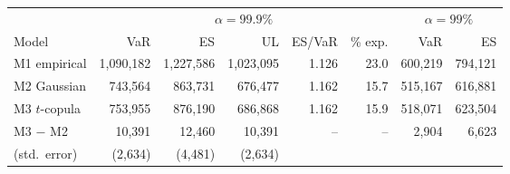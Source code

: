 \begin{tabular}{lrrrrrrr}
\toprule
 & \multicolumn{5}{c}{$\alpha=99.9\%$} & \multicolumn{2}{c}{$\alpha=99\%$} \\
\cmidrule(lr){2-6}\cmidrule(lr){7-8}
Model & VaR & ES & UL & ES/VaR & \% exp. & VaR & ES \\
\midrule
M1 empirical & 1,090,182 & 1,227,586 & 1,023,095 & 1.126 & 23.0 & 600,219 & 794,121 \\
M2 Gaussian & 743,564 & 863,731 & 676,477 & 1.162 & 15.7 & 515,167 & 616,881 \\
M3 $t$-copula & 753,955 & 876,190 & 686,868 & 1.162 & 15.9 & 518,071 & 623,504 \\
\midrule
M3 $-$ M2 & 10,391 & 12,460 & 10,391 & -- & -- & 2,904 & 6,623 \\
(std.\ error) & (2,634) & (4,481) & (2,634) &  &  &  &  \\
\bottomrule
\end{tabular}
